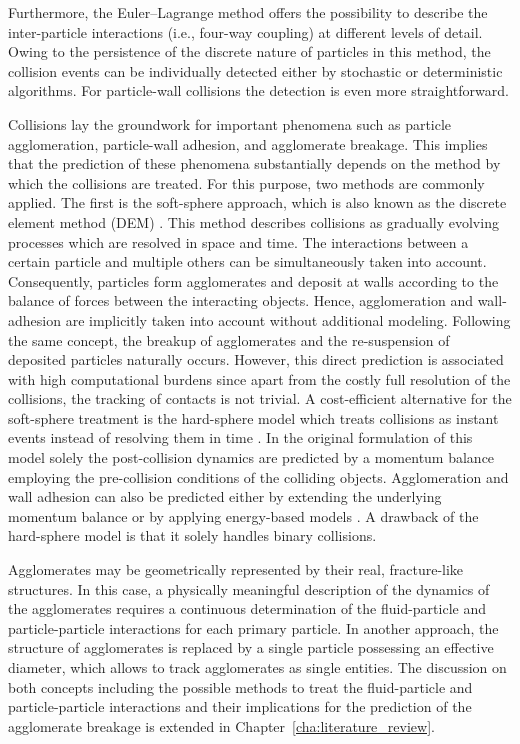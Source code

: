 Furthermore, the Euler--Lagrange method offers the possibility to
describe the inter-particle interactions (i.e., four-way coupling) at
different levels of detail. Owing to the persistence of the discrete
nature of particles in this method, the collision events can be
individually detected either by stochastic \citep{sommerfeld2001} or
deterministic \citep{bird76,breuer2012b} algorithms. For particle-wall
collisions the detection is even more straightforward.

 Collisions lay the groundwork for important phenomena such as
 particle agglomeration, particle-wall adhesion, and agglomerate
 breakage. This implies that the prediction of these phenomena
 substantially depends on the method by which the collisions are
 treated. For this purpose, two methods are commonly applied. The
 first is the soft-sphere approach, which is also known as the
 discrete element method (DEM) \citep{cundall1979}. This method
 describes collisions as gradually evolving processes which are
 resolved in space and time. The interactions between a certain
 particle and multiple others can be simultaneously taken into
 account.  Consequently, particles form agglomerates and deposit at
 walls according to the balance of forces between the interacting
 objects. Hence, agglomeration and wall-adhesion are implicitly taken
 into account without additional modeling.  Following the same
 concept, the breakup of agglomerates and the re-suspension of
 deposited particles naturally occurs. However, this direct prediction
 is associated with high computational burdens since apart from the
 costly full resolution of the collisions, the tracking of contacts is
 not trivial. A cost-efficient alternative for the soft-sphere
 treatment is the hard-sphere model which treats collisions as instant
 events instead of resolving them in time \citep{crowe98}. In the
 original formulation of this model solely the post-collision dynamics
 are predicted by a momentum balance employing the pre-collision
 conditions of the colliding objects. Agglomeration and wall adhesion
 can also be predicted either by extending the underlying momentum
 balance \citep{kosinski2009,kosinski2010,breuer2015a,almohammed2016b}
 or by applying energy-based models
 \citep{disshiller1981,dissjuergens2012,almohammed2016}. A drawback of
 the hard-sphere model is that it solely handles binary collisions.

  Agglomerates may be geometrically represented by their real,
  fracture-like structures. In this case, a physically meaningful
  description of the dynamics of the agglomerates requires a
  continuous determination of the fluid-particle and particle-particle
  interactions for each primary particle.  In another approach, the
  structure of agglomerates is replaced by a single particle
  possessing an effective diameter, which allows to track
  agglomerates as single entities.  The discussion on both concepts
  including the possible methods to treat the fluid-particle and
  particle-particle interactions and their implications for the
  prediction of the agglomerate breakage is extended in
  Chapter~\ref{cha:literature_review}. \newline

